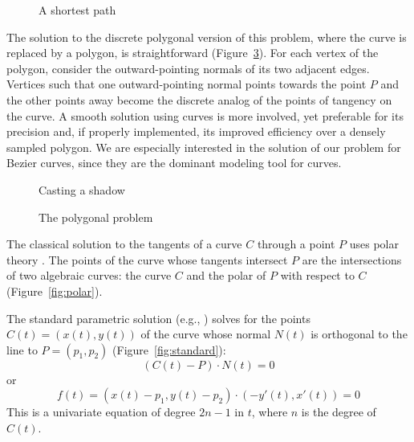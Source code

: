 \documentclass[twocolumn,10pt]{article}
\begin{document}


\begin{figure}
\hspace{1in} \setjjposh
\caption{A shortest path}
\label{fig:motion}
\end{figure}

The solution to the discrete polygonal version of this problem,
where the curve is replaced by a polygon, is straightforward
(Figure~\ref{fig:polygon}).
For each vertex of the polygon, consider the outward-pointing normals
of its two adjacent edges.
Vertices such that one outward-pointing
\clearpage
\noindent normal points towards the point $P$
and the other points away become the discrete analog of the points of 
tangency on the curve.
A smooth solution using curves is more involved, 
yet preferable for its precision and, 
if properly implemented, its improved efficiency over a densely sampled polygon.
We are especially interested in the solution of our problem for Bezier
curves, since they are the dominant modeling tool for curves.



\begin{figure}
\hspace{.4in} \setjjpoca
\caption{Casting a shadow}
\label{fig:shadow}
\end{figure}



\begin{figure}
\hspace{.25in} \setjjpoly
\caption{The polygonal problem}
\label{fig:polygon}
\end{figure}

The classical solution to the tangents of a curve $C$
through a point $P$ uses polar theory \cite{semple85}.
The points of the curve whose tangents intersect $P$ are 
the intersections of two algebraic curves:
the curve $C$ and the polar of $P$ with respect to $C$
(Figure~\ref{fig:polar}).

The standard parametric solution (e.g., \cite{kim88})
solves for the points $C(t) = (x(t),y(t))$ of the curve whose normal $N(t)$
is orthogonal to the line to $P = (p_1,p_2)$ (Figure~\ref{fig:standard}):
\begin{equation}
\label{eq:standard}
 	(C(t) - P) \cdot N(t) = 0
\end{equation}
or
\[
	f(t) = (x(t) - p_1, y(t) - p_2) \cdot (-y'(t), x'(t)) = 0
\]
This is a univariate equation of degree $2n-1$ in $t$,
where $n$ is the degree of $C(t)$.
\end{document}
